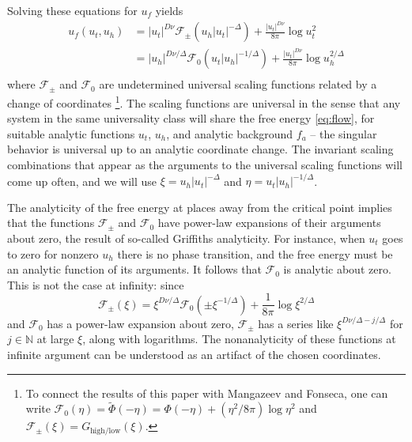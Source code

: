 \documentclass[
aps,
pre,
preprint,
longbibliography,
floatfix
]{revtex4-2}
\begin{document}
Solving these equations for $u_f$ yields
\begin{equation}
\label{eq:FpmF0eqns}
  \begin{aligned}
    u_f(u_t, u_h)
    &=|u_t|^{D\nu}\mathcal F_\pm(u_h|u_t|^{-\Delta})+\frac{|u_t|^{D\nu}}{8\pi}\log u_t^2 \\
    &=|u_h|^{D\nu/\Delta}\mathcal F_0(u_t|u_h|^{-1/\Delta})+\frac{|u_t|^{D\nu}}{8\pi}\log u_h^{2/\Delta} \\
  \end{aligned}
\end{equation}
where $\mathcal F_\pm$ and $\mathcal F_0$ are undetermined universal scaling functions
related by a change of coordinates \footnote{To connect the results of this
  paper with Mangazeev and Fonseca, one can write $\mathcal
  F_0(\eta)=\tilde\Phi(-\eta)=\Phi(-\eta)+(\eta^2/8\pi) \log \eta^2$ and
$\mathcal F_\pm(\xi)=G_{\mathrm{high}/\mathrm{low}}(\xi)$.}.  The scaling
functions are universal in the sense that any system in the same universality class will share the free energy \eqref{eq:flow}, for suitable analytic functions $u_t$, $u_h$, and analytic background $f_a$ -- the singular behavior is universal up to an analytic coordinate change.
The invariant scaling combinations that appear as the
arguments to the universal scaling functions will come up often, and we will
use $\xi=u_h|u_t|^{-\Delta}$ and $\eta=u_t|u_h|^{-1/\Delta}$.

The analyticity of the free energy at places away from the critical point
implies that the functions $\mathcal F_\pm$ and $\mathcal F_0$ have power-law
expansions of their arguments about zero, the result of so-called Griffiths
analyticity. For instance, when $u_t$ goes to zero for nonzero $u_h$ there is
no phase transition, and the free energy must be an analytic function of its
arguments. It follows that $\mathcal F_0$ is analytic about zero. This is not
the case at infinity: since
\begin{equation}
  \mathcal F_\pm(\xi)
  =\xi^{D\nu/\Delta}\mathcal F_0(\pm \xi^{-1/\Delta})+\frac1{8\pi}\log\xi^{2/\Delta}
\end{equation}
and $\mathcal F_0$ has a power-law expansion about zero, $\mathcal F_\pm$ has a
series like $\xi^{D\nu/\Delta-j/\Delta}$ for $j\in\mathbb N$ at large $\xi$,
along with logarithms. The nonanalyticity of these functions at infinite
argument can be understood as an artifact of the chosen coordinates.
\end{document}
